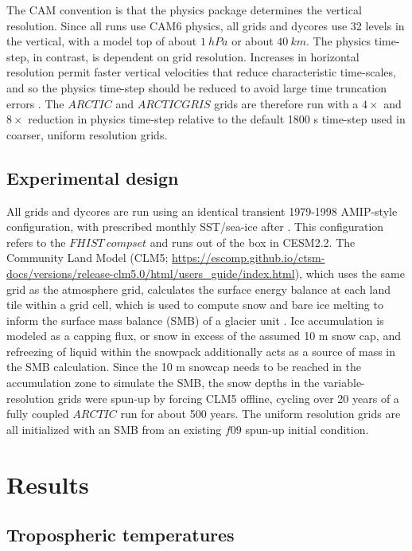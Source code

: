 \documentclass[draft]{agujournal2019}
\begin{document}
The CAM convention is that the physics package determines the vertical resolution. Since all runs use CAM6 physics, all grids and dycores use 32 levels in the vertical, with a model top of about $1 \ hPa$ or about $40 \ km$. The physics time-step, in contrast, is dependent on grid resolution. Increases in horizontal resolution permit faster vertical velocities that reduce characteristic time-scales, and so the physics time-step should be reduced to avoid large time truncation errors \cite{HR2018JAMES}. The $ARCTIC$ and $ARCTICGRIS$ grids are therefore run with a $4\times$ and $8\times$ reduction in physics time-step relative to the default 1800 s time-step used in coarser, uniform resolution grids.

\subsection{Experimental design}

All grids and dycores are run using an identical transient 1979-1998 AMIP-style configuration, with prescribed monthly SST/sea-ice after \cite{CESMSST}. This configuration refers to the $FHIST \ compset$ and runs out of the box in CESM2.2. The Community Land Model (CLM5; \url{https://escomp.github.io/ctsm-docs/versions/release-clm5.0/html/users_guide/index.html}), which uses the same grid as the atmosphere grid, calculates the surface energy balance at each land tile within a grid cell, which is used to compute snow and bare ice melting to inform the surface mass balance (SMB) of a glacier unit \cite{VKETAL2020JGR}. Ice accumulation is modeled as a capping flux, or snow in excess of the assumed 10 m snow cap, and refreezing of liquid within the snowpack additionally acts as a source of mass in the SMB calculation. Since the 10 m snowcap needs to be reached in the accumulation zone to simulate the SMB, the snow depths in the variable-resolution grids were spun-up  by forcing CLM5 offline, cycling over 20 years of a fully coupled $ARCTIC$ run for about 500 years. The uniform resolution grids are all initialized with an SMB from an existing $f09$ spun-up initial condition. 

\section{Results}\label{sec:results}

\subsection{Tropospheric temperatures}
\end{document}
